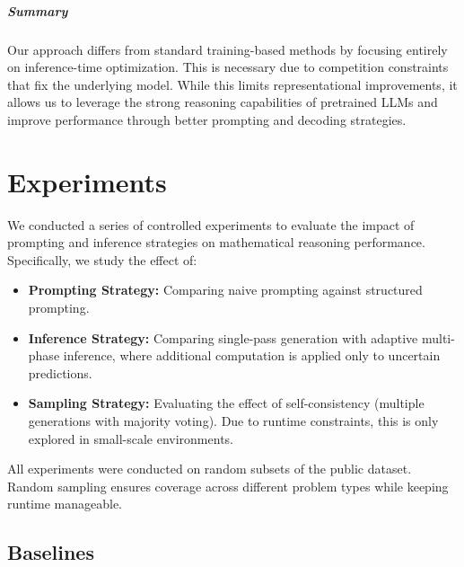 \documentclass{article}
\begin{document}
\subparagraph{Summary} Our approach differs from standard training-based methods by focusing entirely on inference-time optimization. This is necessary due to competition constraints that fix the underlying model. While this limits representational improvements, it allows us to leverage the strong reasoning capabilities of pretrained LLMs and improve performance through better prompting and decoding strategies.

\section{Experiments}
\label{sec:experiments}
% 

We conducted a series of controlled experiments to evaluate the impact of prompting and inference strategies on mathematical reasoning performance. Specifically, we study the effect of:
\begin{itemize}
    \item \textbf{Prompting Strategy:} Comparing naive prompting against structured prompting.
    \item \textbf{Inference Strategy:} Comparing single-pass generation with adaptive multi-phase inference, where additional computation is applied only to uncertain predictions.
    \item \textbf{Sampling Strategy:} Evaluating the effect of self-consistency (multiple generations with majority voting). Due to runtime constraints, this is only explored in small-scale environments.
\end{itemize}
All experiments were conducted on random subsets of the public dataset. Random sampling ensures coverage across different problem types while keeping runtime manageable.

\subsection{Baselines}
\label{sec:baselines}
\end{document}
